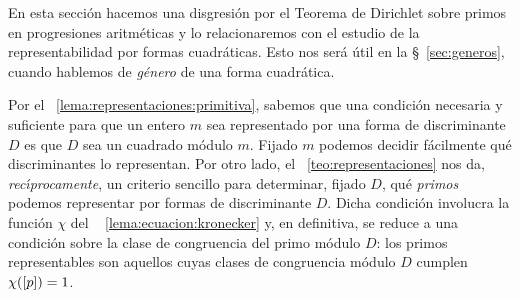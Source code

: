 En esta secci\'on hacemos una disgresi\'on por el
Teorema de Dirichlet sobre primos en progresiones aritm\'eticas y
lo relacionaremos con el estudio de la representabilidad por formas
cuadr\'aticas. Esto nos ser\'a \'util en la \S~\ref{sec:generos},
cuando hablemos de \emph{g\'enero} de una forma cuadr\'atica.

Por el \lemaname~\ref{lema:representaciones:primitiva}, sabemos que una
condici\'on necesaria y suficiente para que un entero $m$ sea representado
por una forma de discriminante $D$ es que $D$ sea un cuadrado m\'odulo $m$.
Fijado $m$ podemos decidir f\'acilmente qu\'e discriminantes lo representan.
Por otro lado, el \teoname~\ref{teo:representaciones} nos da,
\emph{rec\'{\i}procamente}, un criterio sencillo para determinar, fijado $D$,
qu\'e \emph{primos} podemos representar por formas de discriminante $D$.
Dicha condici\'on involucra la funci\'on $\chi$ del \lemaname~%
\ref{lema:ecuacion:kronecker} y, en definitiva, se reduce a una condici\'on
sobre la clase de congruencia del primo m\'odulo $D$:
los primos representables son aquellos cuyas clases de congruencia m\'odulo
$D$ cumplen $\chi(\left[p\right])=1$.


